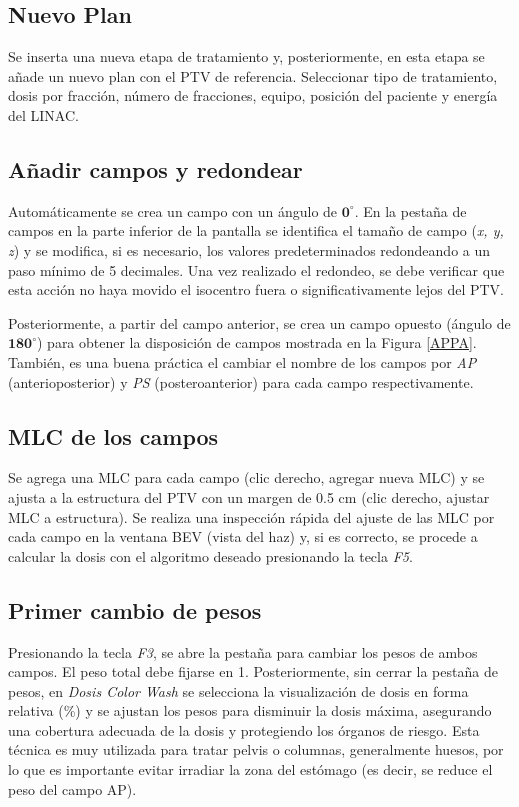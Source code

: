 \documentclass{article}
\begin{document}
\subsection*{Nuevo Plan}

Se inserta una nueva etapa de tratamiento y, posteriormente, en esta etapa se añade un nuevo plan con el PTV de referencia. Seleccionar tipo de tratamiento, dosis por fracción, número de fracciones, equipo, posición del paciente y energía del LINAC.

\subsection*{Añadir campos y redondear}

Automáticamente se crea un campo con un ángulo de $\mathbf{0^{\circ}}$. En la pestaña de campos en la parte inferior de la pantalla se identifica el tamaño de campo (\textit{x, y, z}) y se modifica, si es necesario, los valores predeterminados redondeando a un paso mínimo de 5 decimales. Una vez realizado el redondeo, se debe verificar que esta acción no haya movido el isocentro fuera o significativamente lejos del PTV.

Posteriormente, a partir del campo anterior, se crea un campo opuesto (ángulo de $\mathbf{180^{\circ}}$) para obtener la disposición de campos mostrada en la Figura \ref{APPA}. También, es una buena práctica el cambiar el nombre de los campos por \textit{AP} (anterioposterior) y \textit{PS} (posteroanterior) para cada campo respectivamente.

\subsection*{MLC de los campos}

Se agrega una MLC para cada campo (clic derecho, agregar nueva MLC) y se ajusta a la estructura del PTV con un margen de 0.5 cm (clic derecho, ajustar MLC a estructura). Se realiza una inspección rápida del ajuste de las MLC por cada campo en la ventana BEV (vista del haz) y, si es correcto, se procede a calcular la dosis con el algoritmo deseado presionando la tecla \textit{F5}.

\subsection*{Primer cambio de pesos}

Presionando la tecla \textit{F3}, se abre la pestaña para cambiar los pesos de ambos campos. El peso total debe fijarse en 1. Posteriormente, sin cerrar la pestaña de pesos, en \textit{Dosis Color Wash} se selecciona la visualización de dosis en forma relativa (\%) y se ajustan los pesos para disminuir la dosis máxima, asegurando una cobertura adecuada de la dosis y protegiendo los órganos de riesgo. Esta técnica es muy utilizada para tratar pelvis o columnas, generalmente huesos, por lo que es importante evitar irradiar la zona del estómago (es decir, se reduce el peso del campo AP).
\end{document}
